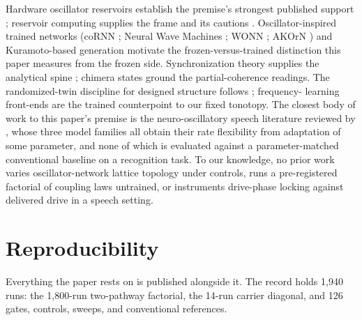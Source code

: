 \documentclass[10pt]{article}
\makeatletter
\newcounter{none} %
\newcommand{\tmlr@floatbarrier}{\par\vspace{\z@}%
  \ifx\@deferlist\@empty\else\clearpage\fi}
\let\tmlr@section\section
\renewcommand{\section}{\tmlr@floatbarrier\tmlr@section}
\makeatother
\begin{document}
Hardware oscillator reservoirs establish the premise's strongest
published support \citep{torrejon2017}; reservoir computing supplies the
frame and its cautions
\citep{jaeger2001, maass2002, lukosevicius2012, tanaka2019}.
Oscillator-inspired trained networks (coRNN \citep{rusch2021}; Neural
Wave Machines \citep{keller2023}; WONN \citep{dai2026}; AKOrN
\citep{miyato2025}) and Kuramoto-based generation \citep{unconv-ai2026}
motivate the frozen-versus-trained distinction this paper measures from
the frozen side. Synchronization theory supplies the analytical spine
\citep{winfree1967, kuramoto1975, sakaguchi1986, adler1946, pikovsky2001, strogatz2000};
chimera states \citep{kuramoto2002, abrams2004} ground the
partial-coherence readings. The randomized-twin discipline for designed
structure follows \citep{caranzano}; frequency- learning front-ends
\citep{lostanlen, zeghidour} are the trained counterpoint to our fixed
tonotopy. The closest body of work to this paper's premise is the
neuro-oscillatory speech literature reviewed by \citep{dogonasheva2026},
whose three model families
\citep{assaneo2020, doelling2023, pittman-polletta2021} all obtain their
rate flexibility from adaptation of some parameter, and none of which is
evaluated against a parameter-matched conventional baseline on a
recognition task. To our knowledge, no prior work varies
oscillator-network lattice topology under controls, runs a
pre-registered factorial of coupling laws untrained, or instruments
drive-phase locking against delivered drive in a speech setting.

\section{Reproducibility}\label{reproducibility}

Everything the paper rests on is published alongside it. The record
holds 1,940 runs: the 1,800-run two-pathway factorial, the 14-run
carrier diagonal, and 126 gates, controls, sweeps, and conventional
references.
\end{document}
